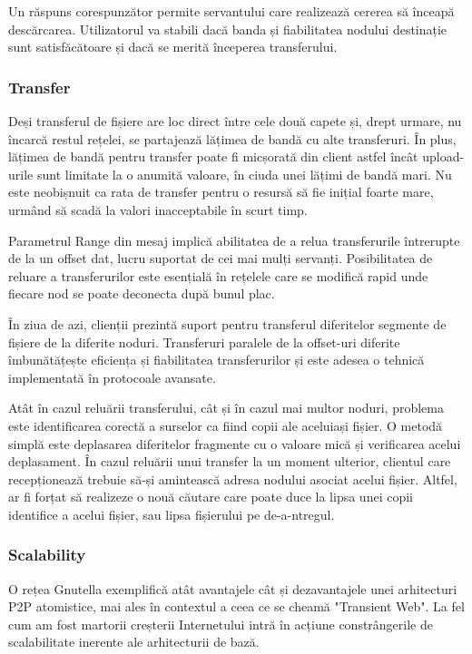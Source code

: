 Un răspuns corespunzător permite servantului care realizează cererea să
înceapă descărcarea. Utilizatorul va stabili dacă banda și fiabilitatea
nodului destinație sunt satisfăcătoare și dacă se merită începerea
transferului.

\subsubsection{Transfer}

Deși transferul de fișiere are loc direct între cele două capete și, drept
urmare, nu încarcă restul rețelei, se partajează lățimea de bandă cu alte
transferuri. În plus, lățimea de bandă pentru transfer poate fi micșorată din
client astfel încât upload-urile sunt limitate la o anumită valoare, în ciuda
unei lățimi de bandă mari. Nu este neobișnuit ca rata de transfer pentru o
resursă să fie inițial foarte mare, urmând să scadă la valori inacceptabile în
scurt timp.

Parametrul Range din mesaj implică abilitatea de a relua transferurile
întrerupte de la un offset dat, lucru suportat de cei mai mulți servanți.
Posibilitatea de reluare a transferurilor este esențială în rețelele care se
modifică rapid unde fiecare nod se poate deconecta după bunul plac.

În ziua de azi, clienții prezintă suport pentru transferul diferitelor
segmente de fișiere de la diferite noduri. Transferuri paralele de la
offset-uri diferite îmbunătățește eficiența și fiabilitatea transferurilor și
este adesea o tehnică implementată în protocoale avansate.

Atât în cazul reluării transferului, cât și în cazul mai multor noduri,
problema este identificarea corectă a surselor ca fiind copii ale aceluiași
fișier. O metodă simplă este deplasarea diferitelor fragmente cu o valoare
mică și verificarea acelui deplasament. În cazul reluării unui transfer la un
moment ulterior, clientul care recepționează trebuie să-și amintească adresa
nodului asociat acelui fișier. Altfel, ar fi forțat să realizeze o nouă
căutare care poate duce la lipsa unei copii identifice a acelui fișier, sau
lipsa fișierului pe de-a-ntregul.

\subsubsection{Scalability}

O rețea Gnutella exemplifică atât avantajele cât și dezavantajele unei
arhitecturi P2P atomistice, mai ales în contextul a ceea ce se cheamă
"Transient Web". La fel cum am fost martorii creșterii Internetului intră în
acțiune constrângerile de scalabilitate inerente ale arhitecturii de bază.

